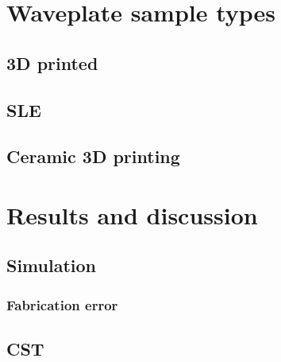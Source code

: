 \section{Waveplate sample types}
\subsection{3D printed}
\subsection{SLE}
\subsection{Ceramic 3D printing}
\section{Results and discussion}
\subsection{Simulation}
\subsubsection{Fabrication error}
\subsection{CST}
